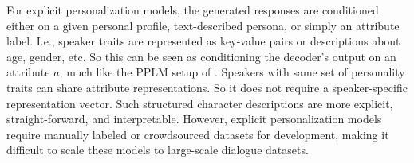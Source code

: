For explicit personalization models, the generated responses are conditioned either on a given personal profile, text-described persona, or simply an attribute label. I.e., speaker traits are represented as key-value pairs or descriptions about age, gender, etc. So this can be seen as conditioning the decoder's output on an attribute $a$, much like the PPLM setup of \cite{dathathri2019plug}. Speakers with same set of personality traits can share attribute representations. So it does not require a speaker-specific representation vector. Such structured character descriptions are more explicit, straight-forward, and interpretable. However, explicit personalization models require manually labeled or crowdsourced datasets for development, making it difficult to scale these models to large-scale dialogue datasets.


